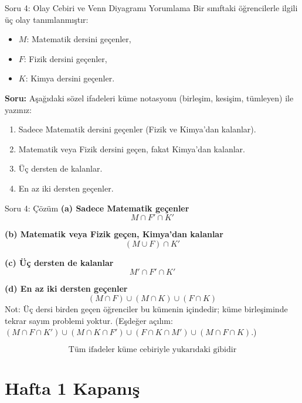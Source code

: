 \documentclass[light]{lutbeamer}
\begin{document}
\begin{frame}{Soru 4: Olay Cebiri ve Venn Diyagramı Yorumlama}
    Bir sınıftaki öğrencilerle ilgili üç olay tanımlanmıştır:
    \begin{itemize}
        \item $M$: Matematik dersini geçenler,
        \item $F$: Fizik dersini geçenler,
        \item $K$: Kimya dersini geçenler.
    \end{itemize}
    
    \textbf{Soru:} Aşağıdaki sözel ifadeleri küme notasyonu (birleşim, kesişim, tümleyen) ile yazınız:
    \begin{enumerate}
        \item[(a)] Sadece Matematik dersini geçenler (Fizik ve Kimya'dan kalanlar).
        \item[(b)] Matematik veya Fizik dersini geçen, fakat Kimya'dan kalanlar.
        \item[(c)] Üç dersten de kalanlar.
        \item[(d)] En az iki dersten geçenler.
    \end{enumerate}
\end{frame}

\begin{frame}{Soru 4: Çözüm}
    \color{red}
    \small
    \textbf{(a) Sadece Matematik geçenler}
    \[
    M\cap F'\cap K'
    \]
    
    \textbf{(b) Matematik veya Fizik geçen, Kimya'dan kalanlar}
    \[
    (M\cup F)\cap K'
    \]
    
    \textbf{(c) Üç dersten de kalanlar}
    \[
    M'\cap F'\cap K'
    \]
    
    \textbf{(d) En az iki dersten geçenler}
    \[
    (M\cap F)\cup(M\cap K)\cup(F\cap K)
    \]
    Not: Üç dersi birden geçen öğrenciler bu kümenin içindedir; küme birleşiminde tekrar sayım problemi yoktur.
    (Eşdeğer açılım: $(M\cap F\cap K')\cup(M\cap K\cap F')\cup(F\cap K\cap M')\cup(M\cap F\cap K)$.)
    
    \[
    \boxed{\text{Tüm ifadeler küme cebiriyle yukarıdaki gibidir}}
    \]
\end{frame}

\section{Hafta 1 Kapanış}
\end{document}
